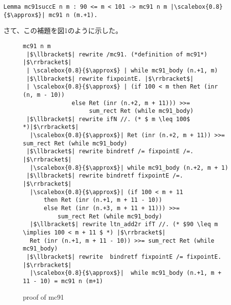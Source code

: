 \documentclass[japanese]{jssst_ppl}
\theoremstyle{definition}
\begin{document}
\begin{verbatim}
Lemma mc91succE n m : 90 <= m < 101 -> mc91 n m |\scalebox{0.8}{$\approx$}| mc91 n (m.+1).
\end{verbatim}

さて、この補題を図1のように示した。




\begin{figure}[H]
  \centering

  \begin{verbatim}
mc91 n m
 |$\llbracket$| rewrite /mc91. (*definition of mc91*) |$\rrbracket$|
 | \scalebox{0.8}{$\approx$} | while mc91_body (n.+1, m)
 |$\llbracket$| rewrite fixpointE. |$\rrbracket$|
 | \scalebox{0.8}{$\approx$} | (if 100 < m then Ret (inr (n, m - 10))
              else Ret (inr (n.+2, m + 11))) >>=
                   sum_rect Ret (while mc91_body)
 |$\llbracket$| rewrite ifN //. (* $ m \leq 100$ *)|$\rrbracket$|
  |\scalebox{0.8}{$\approx$}| Ret (inr (n.+2, m + 11)) >>= sum_rect Ret (while mc91_body)
 |$\llbracket$| rewrite bindretf /= fixpointE /=. |$\rrbracket$|
  |\scalebox{0.8}{$\approx$}| while mc91_body (n.+2, m + 1)
 |$\llbracket$| rewrite bindretf fixpointE /=. |$\rrbracket$|
  |\scalebox{0.8}{$\approx$}| (if 100 < m + 11
      then Ret (inr (n.+1, m + 11 - 10))
      else Ret (inr (n.+3, m + 11 + 11))) >>=
          sum_rect Ret (while mc91_body)
  |$\llbracket$| rewrite ltn_add2r ifT //. (* $90 \leq m \implies 100 < m + 11 $ *) |$\rrbracket$|
  Ret (inr (n.+1, m + 11 - 10)) >>= sum_rect Ret (while mc91_body)
 |$\llbracket$| rewrite  bindretf fixpointE /= fixpointE. |$\rrbracket$|
  |\scalebox{0.8}{$\approx$}|  while mc91_body (n.+1, m + 11 - 10) = mc91 n (m+1)

    \end{verbatim}


  \caption{proof of mc91 }
\end{figure}
\end{document}
